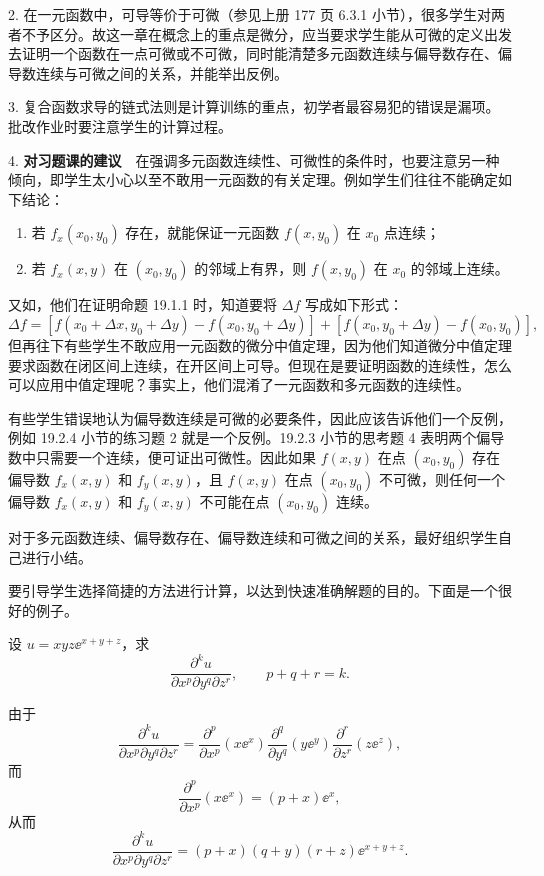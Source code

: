 2. 在一元函数中，可导等价于可微（参见上册 177 页 6.3.1 小节），很多学生对两者不予区分。故这一章在概念上的重点是微分，应当要求学生能从可微的定义出发去证明一个函数在一点可微或不可微，同时能清楚多元函数连续与偏导数存在、偏导数连续与可微之间的关系，并能举出反例。

3. 复合函数求导的链式法则是计算训练的重点，初学者最容易犯的错误是漏项。批改作业时要注意学生的计算过程。

4. \textbf{对习题课的建议}　在强调多元函数连续性、可微性的条件时，也要注意另一种倾向，即学生太小心以至不敢用一元函数的有关定理。例如学生们往往不能确定如下结论：
\begin{enumerate}[label=(\arabic*)]
  \item 若 $f_x(x_0,y_0)$ 存在，就能保证一元函数 $f(x,y_0)$ 在 $x_0$ 点连续；
  \item 若 $f_x(x,y)$ 在 $(x_0,y_0)$ 的邻域上有界，则 $f(x,y_0)$ 在 $x_0$ 的邻域上连续。
\end{enumerate}
又如，他们在证明命题 19.1.1 时，知道要将 $\Delta f$ 写成如下形式：
\[
  \Delta f=[f(x_0+\Delta x,y_0+\Delta y)-f(x_0,y_0+\Delta y)]
  +[f(x_0,y_0+\Delta y)-f(x_0,y_0)],
\]
但再往下有些学生不敢应用一元函数的微分中值定理，因为他们知道微分中值定理要求函数在闭区间上连续，在开区间上可导。但现在是要证明函数的连续性，怎么可以应用中值定理呢？事实上，他们混淆了一元函数和多元函数的连续性。

有些学生错误地认为偏导数连续是可微的必要条件，因此应该告诉他们一个反例，例如 19.2.4 小节的练习题 2 就是一个反例。19.2.3 小节的思考题 4 表明两个偏导数中只需要一个连续，便可证出可微性。因此如果 $f(x,y)$ 在点 $(x_0,y_0)$ 存在偏导数 $f_x(x,y)$ 和 $f_y(x,y)$，且 $f(x,y)$ 在点 $(x_0,y_0)$ 不可微，则任何一个偏导数 $f_x(x,y)$ 和 $f_y(x,y)$ 不可能在点 $(x_0,y_0)$ 连续。

对于多元函数连续、偏导数存在、偏导数连续和可微之间的关系，最好组织学生自己进行小结。

要引导学生选择简捷的方法进行计算，以达到快速准确解题的目的。下面是一个很好的例子。

\begin{xexample}[19.5.1]
设 $u=xyz\ee^{x+y+z}$，求
\[
  \frac{\partial^k u}{\partial x^p\partial y^q\partial z^r},
  \qquad p+q+r=k.
\]
\end{xexample}
\begin{xsolution}
由于
\[
  \frac{\partial^k u}{\partial x^p\partial y^q\partial z^r}
  =\frac{\partial^p}{\partial x^p}(x\ee^x)
   \frac{\partial^q}{\partial y^q}(y\ee^y)
   \frac{\partial^r}{\partial z^r}(z\ee^z),
\]
而
\[
  \frac{\partial^p}{\partial x^p}(x\ee^x)=(p+x)\ee^x,
\]
从而
\[
  \frac{\partial^k u}{\partial x^p\partial y^q\partial z^r}
  =(p+x)(q+y)(r+z)\ee^{x+y+z}.
\]
\end{xsolution}

